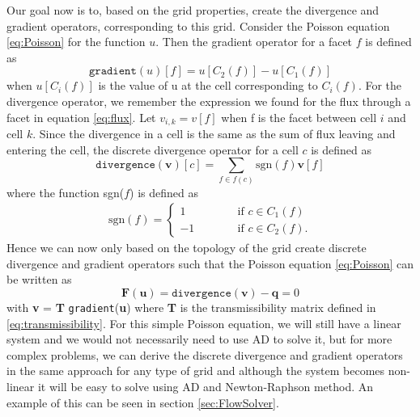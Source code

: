 Our goal now is to, based on the grid properties, create the divergence and gradient operators, corresponding to this grid. Consider the Poisson equation \eqref{eq:Poisson} for the function $u$. Then the gradient operator for a facet $f$ is defined as 
\begin{equation*}
    \texttt{gradient}(u)[f] = u[C_2(f)] - u[C_1(f)] 
\end{equation*}
when $u[C_i(f)]$ is the value of u at the cell corresponding to $C_i(f)$. For the divergence operator, we remember the expression we found for the flux through a facet in equation \eqref{eq:flux}. Let $v_{i,k} = v[f]$ when f is the facet between cell $i$ and cell $k$. Since the divergence in a cell is the same as the sum of flux leaving and entering the cell, the discrete divergence operator for a cell $c$ is defined as 
\begin{equation*}
    \texttt{divergence}(\textbf{v})[c] = \sum_{f\in f(c)} \text{sgn}(f)\textbf{v}[f]
\end{equation*}
where the function sgn($f$) is defined as 
\begin{align*}
    \text{sgn}(f) = \left\lbrace
    \begin{array}{rr}
        1 \hspace{3em}& \text{if } c \in C_1(f)\\
        -1 \hspace{3em}& \text{if } c \in C_2(f).
    \end{array}
    \right.
\end{align*}
Hence we can now only based on the topology of the grid create discrete divergence and gradient operators such that the Poisson equation \eqref{eq:Poisson} can be written as
\begin{equation*}
    \textbf{F}(\textbf{u}) = \texttt{divergence}(\textbf{v})-\textbf{q} = 0
\end{equation*}
with \textbf{v} = \textbf{T }\texttt{gradient}(\textbf{u}) where \textbf{T} is the transmissibility matrix defined in \eqref{eq:transmissibility}. For this simple Poisson equation, we will still have a linear system and we would not necessarily need to use AD to solve it, but for more complex problems, we can derive the discrete divergence and gradient operators in the same approach for any type of grid and although the system becomes non-linear it will be easy to solve using AD and Newton-Raphson method. An example of this can be seen in section \ref{sec:FlowSolver}.

 




























